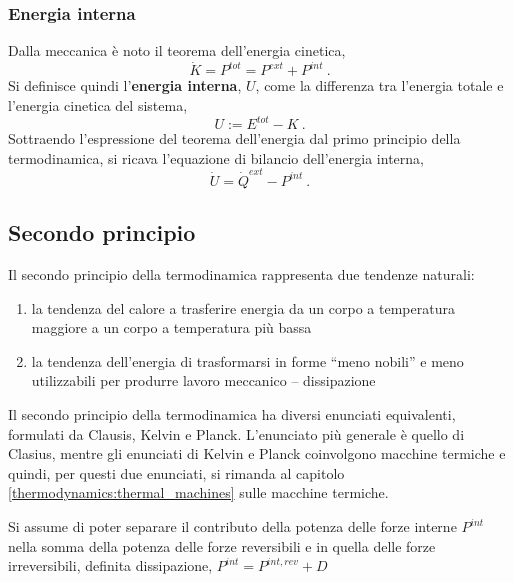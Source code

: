 \subsubsection{Energia interna}
Dalla meccanica è noto il teorema dell'energia cinetica,
\begin{equation}
  \dot{K} = P^{tot} = P^{ext} + P^{int} \ .
\end{equation}
Si definisce quindi l'\textbf{energia interna}, $U$, come la differenza tra l'energia totale e l'energia cinetica del sistema,
\begin{equation}
  U := E^{tot} - K \ .
\end{equation}
Sottraendo l'espressione del teorema dell'energia dal primo principio della termodinamica, si ricava l'equazione di bilancio dell'energia interna,
\begin{equation}
  \dot{U} = \dot{Q}^{ext} - P^{int} \ .
\end{equation}

\subsection{Secondo principio}
Il secondo principio della termodinamica rappresenta due tendenze naturali:
\begin{enumerate}
    \item la tendenza del calore a trasferire energia da un corpo a temperatura maggiore a un corpo a temperatura più bassa
    \item la tendenza dell'energia di trasformarsi in forme ``meno nobili'' e meno utilizzabili per produrre lavoro meccanico -- dissipazione
\end{enumerate}
Il secondo principio della termodinamica ha diversi enunciati equivalenti, formulati da Clausis, Kelvin e Planck.
L'enunciato più generale è quello di Clasius, mentre gli enunciati di Kelvin e Planck coinvolgono macchine termiche e quindi, per questi due enunciati, si rimanda al capitolo \ref{thermodynamics:thermal_machines} sulle macchine termiche.

Si assume di poter separare il contributo della potenza delle forze interne $P^{int}$ nella somma della potenza delle forze reversibili e in quella delle forze irreversibili, definita dissipazione, $P^{int} = P^{int,rev} + D$

